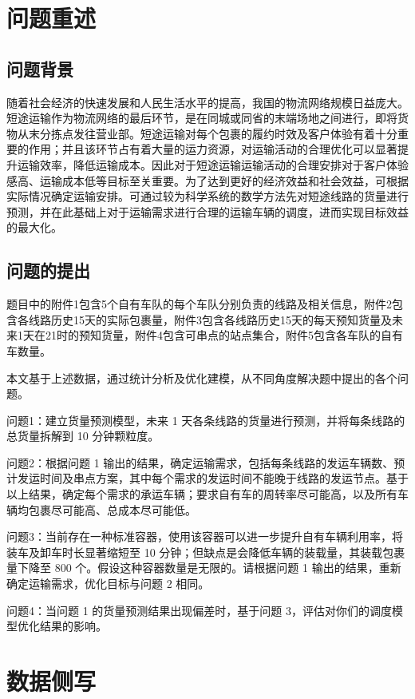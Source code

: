 \documentclass{MMCStyle}
\begin{document}
	\tableofcontents\newpage
    \clearpage
    \pagestyle{fancy}
 
\section{问题重述}
\subsection{问题背景}
随着社会经济的快速发展和人民生活水平的提高，我国的物流网络规模日益庞大。短途运输作为物流网络的最后环节，是在同城或同省的末端场地之间进行，即将货物从末分拣点发往营业部。短途运输对每个包裹的履约时效及客户体验有着十分重要的作用；并且该环节占有着大量的运力资源，对运输活动的合理优化可以显著提升运输效率，降低运输成本。因此对于短途运输运输活动的合理安排对于客户体验感高、运输成本低等目标至关重要。为了达到更好的经济效益和社会效益，可根据实际情况确定运输安排。可通过较为科学系统的数学方法先对短途线路的货量进行预测，并在此基础上对于运输需求进行合理的运输车辆的调度，进而实现目标效益的最大化。

	\subsection{问题的提出}
题目中的附件1包含5个自有车队的每个车队分别负责的线路及相关信息，附件2包含各线路历史15天的实际包裹量，附件3包含各线路历史15天的每天预知货量及未来1天在21时的预知货量，附件4包含可串点的站点集合，附件5包含各车队的自有车数量。

本文基于上述数据，通过统计分析及优化建模，从不同角度解决题中提出的各个问题。

问题1：建立货量预测模型，未来 1 天各条线路的货量进行预测，并将每条线路的总货量拆解到 10 分钟颗粒度。

问题2：根据问题 1 输出的结果，确定运输需求，包括每条线路的发运车辆数、预计发运时间及串点方案，其中每个需求的发运时间不能晚于线路的发运节点。基于以上结果，确定每个需求的承运车辆；要求自有车的周转率尽可能高，以及所有车辆均包裹尽可能高、总成本尽可能低。

问题3：当前存在一种标准容器，使用该容器可以进一步提升自有车辆利用率，将装车及卸车时长显著缩短至 10 分钟；但缺点是会降低车辆的装载量，其装载包裹量下降至 800 个。假设这种容器数量是无限的。请根据问题 1 输出的结果，重新确定运输需求，优化目标与问题 2 相同。

问题4：当问题 1 的货量预测结果出现偏差时，基于问题 3，评估对你们的调度模型优化结果的影响。

\section{数据侧写}
\end{document}
